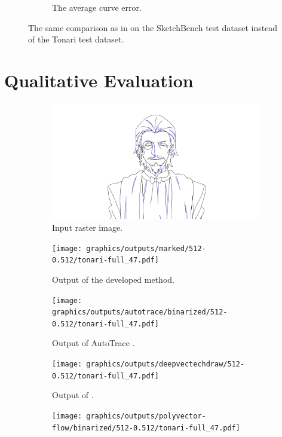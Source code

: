 \begin{figure}[h]
\begin{subfigure}{.3\textwidth}
    \caption{The average curve error.}
\end{subfigure}
    \caption{The same comparison as in  on the SketchBench test dataset instead of the Tonari test dataset.}
    \label{fig:metric_True_1024_sketchbench}
\end{figure}

\clearpage
\section{Qualitative Evaluation}

\begin{figure}[h]
    \centering
    \begin{subfigure}{.49\textwidth}
    \includegraphics[width=\textwidth]{graphics/outputs/ground-truth/tonari-full_47.png}
    \caption{Input raster image.}
    \end{subfigure}
    \begin{subfigure}{.49\textwidth}
    \texttt{[image: graphics/outputs/marked/512-0.512/tonari-full\_47.pdf]}
    \caption{Output of the developed method.}
    \end{subfigure}
    \begin{subfigure}{.49\textwidth}
    \texttt{[image: graphics/outputs/autotrace/binarized/512-0.512/tonari-full\_47.pdf]}
    \caption{Output of AutoTrace \citep{autotrace}.}
    \end{subfigure}
    \begin{subfigure}{.49\textwidth}
    \texttt{[image: graphics/outputs/deepvectechdraw/512-0.512/tonari-full\_47.pdf]}
    \caption{Output of \citet{DBLP:conf/eccv/EgiazarianVAVST20}.}
    \end{subfigure}
    \begin{subfigure}{.49\textwidth}
    \texttt{[image: graphics/outputs/polyvector-flow/binarized/512-0.512/tonari-full\_47.pdf]}

\end{subfigure}
\end{figure}
